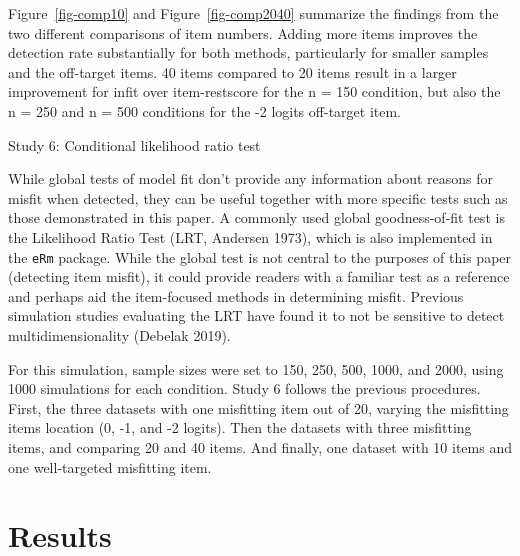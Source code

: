 \documentclass[
  letterpaper,
  DIV=11,
  numbers=noendperiod]{scrartcl}
\begin{document}
Figure~\ref{fig-comp10} and Figure~\ref{fig-comp2040} summarize the
findings from the two different comparisons of item numbers. Adding more
items improves the detection rate substantially for both methods,
particularly for smaller samples and the off-target items. 40 items
compared to 20 items result in a larger improvement for infit over
item-restscore for the n = 150 condition, but also the n = 250 and n =
500 conditions for the -2 logits off-target item.

Study 6: Conditional likelihood ratio test

While global tests of model fit don't provide any information about
reasons for misfit when detected, they can be useful together with more
specific tests such as those demonstrated in this paper. A commonly used
global goodness-of-fit test is the Likelihood Ratio Test (LRT, Andersen
1973), which is also implemented in the \texttt{eRm} package. While the
global test is not central to the purposes of this paper (detecting item
misfit), it could provide readers with a familiar test as a reference
and perhaps aid the item-focused methods in determining misfit. Previous
simulation studies evaluating the LRT have found it to not be sensitive
to detect multidimensionality (Debelak 2019).

For this simulation, sample sizes were set to 150, 250, 500, 1000, and
2000, using 1000 simulations for each condition. Study 6 follows the
previous procedures. First, the three datasets with one misfitting item
out of 20, varying the misfitting items location (0, -1, and -2 logits).
Then the datasets with three misfitting items, and comparing 20 and 40
items. And finally, one dataset with 10 items and one well-targeted
misfitting item.

\section{Results}\label{results-4}
\end{document}
